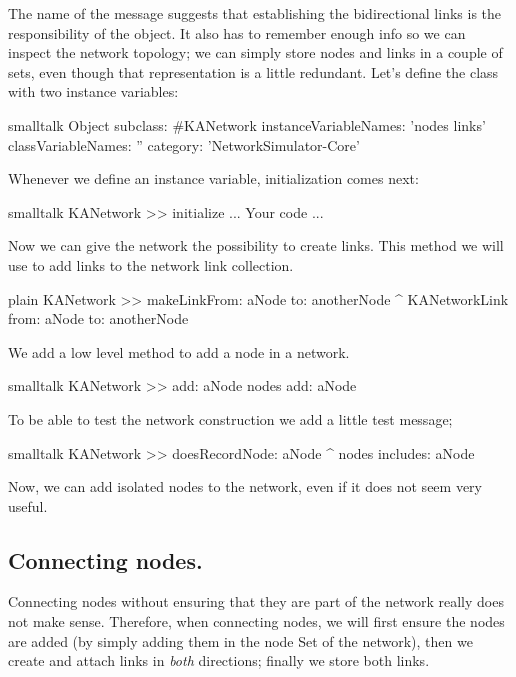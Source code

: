 \documentclass[10pt,twoside,english]{_support/latex/sbabook/sbabook}
\begin{document}
The name of the  message suggests that establishing the bidirectional links is the responsibility of the  object. It also has to remember enough info so we can inspect the network topology; we can simply store nodes and links in a couple of sets, even though that representation is a little redundant.
Let's define the class with two instance variables:

\begin{displaycode}{smalltalk}
Object subclass: #KANetwork
    instanceVariableNames: 'nodes links'
    classVariableNames: ''
    category: 'NetworkSimulator-Core'
\end{displaycode}

Whenever we define an instance variable, initialization comes next:

\begin{displaycode}{smalltalk}
KANetwork >> initialize
    ... Your code ...
\end{displaycode}

Now we can give the network the possibility to create links.  This method we will use to add links to the network link collection.

\begin{displaycode}{plain}
KANetwork >> makeLinkFrom: aNode to: anotherNode
	^ KANetworkLink from: aNode to: anotherNode
\end{displaycode}

We add a low level method  to add a node in a network. 

\begin{displaycode}{smalltalk}
KANetwork >> add: aNode
	nodes add: aNode
\end{displaycode}

To be able to test the network construction we add a little test message;

\begin{displaycode}{smalltalk}
KANetwork >> doesRecordNode: aNode
	^ nodes includes: aNode
\end{displaycode}

Now, we can add isolated nodes to the network, even if it does not seem very useful.
\subsection{Connecting nodes.}
Connecting nodes without ensuring that they are part of the network really does not make sense.
Therefore, when connecting nodes, we will first ensure the nodes are added (by simply adding them in the node Set of the network), then we create and attach links in \textit{both} directions; finally we store both links.
\end{document}
